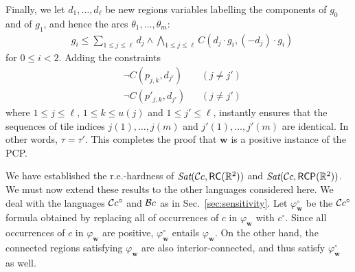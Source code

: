\documentclass{article}
\newcommand{\ic}{c^\circ}
\newcommand{\Sat}{\textit{Sat}}
\newcommand{\R}{\mathbb{R}}
\newcommand{\RC}{{\sf RC}}
\newcommand{\RCP}{{\sf RCP}}
\newcommand{\fW}{\mathbf{w}}
\newcommand{\ti}[2][]{{#2}^{\circ_{#1}}}
\renewcommand{\phi}{\varphi}
\begin{document}
Finally, we let $d_1, \ldots, d_\ell$ be
new regions variables labelling the components of $g_0$ and of $g_1$,
and hence the arcs $\theta_1, \ldots, \theta_m$:
\begin{align*}
& g_i \leq \sum_{1 \leq j \leq \ell} d_j
\wedge \bigwedge_{1 \leq j \leq \ell} C(d_j \cdot g_i, (-d_j) \cdot g_i)
\end{align*}
for $0 \leq i < 2$. Adding the constraints
\begin{align*}
& \neg C(p_{j,k}, d_{j'}) & & (j \neq j')\\
& \neg C(p'_{j,k}, d_{j'}) & & (j \neq j')
\end{align*}
where $1 \leq j \leq \ell$, $1 \leq k \leq u(j)$ and $1 \leq j' \leq
\ell$, instantly ensures that the sequences of tile indices $j(1),
\ldots, j(m)$ and $j'(1), \ldots, j'(m)$ are identical. In other words,
$\tau = \tau'$.  This completes the proof that $\fW$ is a positive
instance of the PCP.

We have established the r.e.-hardness of $\Sat(\cBCc,\RC(\R^2))$ and
$\Sat(\cBCc,\RCP(\R^2))$. We must now extend these results to the
other languages considered here. We deal with the languages $\mathcal{C}c^\circ$
and $\mathcal{B}c$ as in Sec.~\ref{sec:sensitivity}. Let $\ti{\phi}_\fW$ be
the $\mathcal{C}c^\circ$ formula obtained by replacing all of occurrences of $c$
in $\phi_\fW$ with $\ic$. Since all occurrences of $c$ in $\phi_\fW$
are positive, $\ti{\phi}_\fW$ entails $\phi_\fW$. On the other
hand, the connected regions satisfying $\phi_\fW$ are also
interior-connected, and thus satisfy $\ti{\phi}_\fW$ as well.
\end{document}
